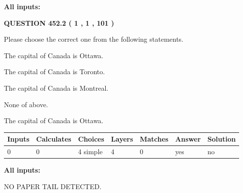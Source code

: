 \documentclass[12pt]{article}
\begin{document}
   
   
   
\noindent\vspace{0.1in}\hspace{-0.08in} {\textbf{\Large{All inputs: }}}
   
   
  
\vspace{0.2in}
  
{\textbf{\Large{QUESTION
452.2 
 ( 1 , 1 , 101 )
}}}
  
  
Please choose the correct one from the following statements.
 
 
The capital of Canada is Ottawa.
 
 
The capital of Canada is Toronto.
 
 
The capital of Canada is Montreal.
 
 
 None of above.
 
 
\noindent{}
 
 
The capital of Canada is Ottawa.
 
 
\noindent{}
 
 
   
   
   
   
\noindent\begin{tabular}{|l|l|l|l|l|l|l|}
 \hline
Inputs & Calculates & Choices & Layers & Matches & Answer & Solution \\ \hline
 0  & 
 0  & 
 4
  simple  
  & 
 4  & 
 0  & 
  yes & 
  no 
  \\ \hline
 \end{tabular}
   
   
   
   
\noindent{}
   
   
   
   
\noindent\vspace{0.1in}\hspace{-0.08in} {\textbf{\Large{All inputs: }}}
   
   
   
   
\vspace{2.0in} NO PAPER TAIL DETECTED.
   
   
   
\end{document}
